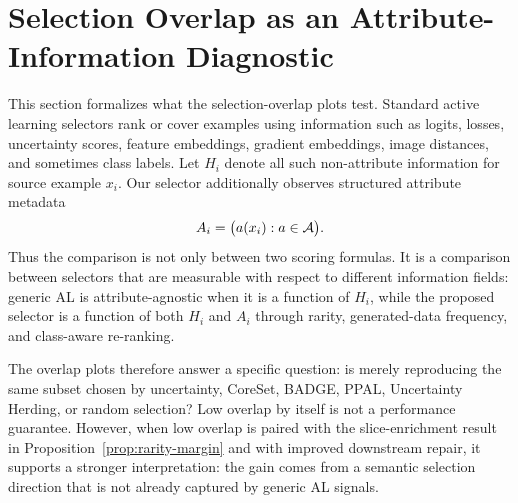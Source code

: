 \section{Selection Overlap as an Attribute-Information Diagnostic}
\label{app:overlap-diagnostic}

This section formalizes what the selection-overlap plots test. Standard active learning selectors rank or cover examples using information such as logits, losses, uncertainty scores, feature embeddings, gradient embeddings, image distances, and sometimes class labels. Let $H_i$ denote all such non-attribute information for source example $x_i$. Our selector additionally observes structured attribute metadata
\begin{equation}
A_i=\big(a(x_i):a\in\mathcal{A}\big).
\end{equation}
Thus the comparison is not only between two scoring formulas. It is a comparison between selectors that are measurable with respect to different information fields: generic AL is attribute-agnostic when it is a function of $H_i$, while the proposed selector is a function of both $H_i$ and $A_i$ through rarity, generated-data frequency, and class-aware re-ranking.

The overlap plots therefore answer a specific question: is \model merely reproducing the same subset chosen by uncertainty, CoreSet, BADGE, PPAL, Uncertainty Herding, or random selection? Low overlap by itself is not a performance guarantee. However, when low overlap is paired with the slice-enrichment result in Proposition~\ref{prop:rarity-margin} and with improved downstream repair, it supports a stronger interpretation: the gain comes from a semantic selection direction that is not already captured by generic AL signals.


